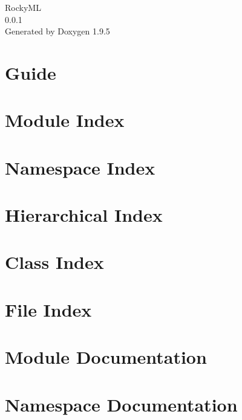 \documentclass[twoside]{book}
\newcommand{\+}{\discretionary{\mbox{\scriptsize$\hookleftarrow$}}{}{}}
\newcommand{\clearemptydoublepage}{%
    \newpage{\pagestyle{empty}\cleardoublepage}%
  }
\begin{document}
  \raggedbottom
    \hypersetup{pageanchor=false,
                bookmarksnumbered=true,
                pdfencoding=unicode
               }
  \begin{titlepage}
  \vspace*{7cm}
  \begin{center}%
  {\Large Rocky\+ML}\\
  [1ex]\large 0.\+0.\+1 \\
  \vspace*{1cm}
  {\large Generated by Doxygen 1.9.5}\\
  \end{center}
  \end{titlepage}
  \clearemptydoublepage
  \tableofcontents
  \clearemptydoublepage
  \hypersetup{pageanchor=true}
\chapter{Guide}
\label{guide}

\chapter{Module Index}

\chapter{Namespace Index}

\chapter{Hierarchical Index}

\chapter{Class Index}

\chapter{File Index}

\chapter{Module Documentation}



\chapter{Namespace Documentation}


\end{document}
